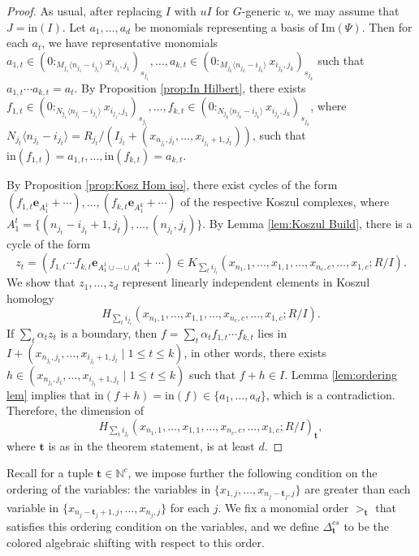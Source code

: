 \documentclass[a4paper, 10pt, reqno, english, ones]{amsart}  %
\theoremstyle{definition}
\theoremstyle{remark}
\begin{document}
\begin{proof}
    As usual, after replacing $I$ with $uI$ for $G$-generic $u$, we may assume that $J=\textrm{in}(I)$. Let $a_1,\dots,a_d$ be monomials representing a basis of $\textrm{Im}(\Psi).$ Then for each $a_t$, we have representative monomials $a_{1,t}\in (0:_{M_{j_1}\langle n_{j_1}-i_{j_1} \rangle}x_{i_{j_1},j_1})_{s_{j_1}},\dots,a_{k,t}\in (0:_{M_{j_k}\langle n_{j_k}-i_{j_k}\rangle }x_{i_{j_k},j_k})_{s_{j_k}}$ such that $a_{1,t}\cdots a_{k,t}=a_t$. By Proposition \ref{prop:In Hilbert}, there exists $f_{1,t}\in (0:_{N_{j_1}\langle n_{j_1}-i_{j_1} \rangle}x_{i_{j_1},j_1})_{s_{j_1}},\dots,f_{k,t}\in (0:_{N_{j_k}\langle n_{j_k}-i_{j_k}\rangle }x_{i_{j_k},j_k})_{s_{j_k}}$, where $N_{j_t}\langle n_{j_t}-i_{j_t} \rangle=R_{j_t}/(I_{j_t} + (x_{n_{j_t},j_t},\dots,x_{i_{j_t}+1,j_t}))$, such that $\textrm{in}(f_{1,t})=a_{1,t},\dots,\textrm{in}(f_{k,t})=a_{k,t}$.

    By Proposition \ref{prop:Kosz Hom iso}, there exist cycles of the form $(f_{1,t}\mathbf{e}_{A_1^{1}}+\cdots),\dots,(f_{k,t}\mathbf{e}_{A_1^{k}}+\cdots)$ of the respective Koszul complexes, where $A^t_1 = \{(n_{j_t}-i_{j_t}+1,j_t),\dots,(n_{j_t},j_t) \}$. By Lemma \ref{lem:Koszul Build}, there is a cycle of the form
    \[
    z_t=(f_{1,t}\cdots f_{k,t}\mathbf{e}_{A_1^1\cup \cdots \cup A_1^k}+\cdots)\in K_{\sum_t i_{j_t}}(x_{n_1,1},\dots,x_{1,1},\dots,x_{n_c,c},\dots,x_{1,c};R/I).
    \]
    We show that $z_1,\dots,z_d$ represent linearly independent elements in Koszul homology $$H_{\sum_t i_{j_t}}(x_{n_1,1},\dots,x_{1,1},\dots,x_{n_c,c},\dots,x_{1,c};R/I).$$ If $\sum_{t}\alpha_t z_t$ is a boundary, then $f=\sum_{t}\alpha_t f_{1,t}\cdots f_{k,t}$ lies in $I+(x_{n_{j_t},j_t},\dots,x_{i_{j_t}+1,j_t}\mid 1\leq t\leq k)$, in other words, there exists $h\in (x_{n_{j_t},j_t},\dots,x_{i_{j_t}+1,j_t}\mid 1\leq t\leq k)$ such that $f+h\in I$. Lemma \ref{lem:ordering lem} implies that $\textrm{in}(f+h) = \textrm{in}(f) \in \{a_1,\dots,a_d\}$, which is a contradiction. Therefore, the dimension of $$H_{\sum_t i_{j_t}}(x_{n_1,1},\dots,x_{1,1},\dots,x_{n_c,c},\dots,x_{1,c};R/I)_{\mathbf{t}},$$ where $\mathbf{t}$ is as in the theorem statement, is at least $d$.
    
\end{proof}

Recall for a tuple $\mathbf{t}\in \mathbb{N}^c$, we impose further the following condition on the ordering of the variables: the variables in $\{x_{1,j},\dots,x_{n_j-\mathbf{t}_j,j} \}$ are greater than each variable in $\{x_{n_j-\mathbf{t}_j+1,j},\dots,x_{n_j,j} \}$ for each $j$. We fix a monomial order $>_\mathbf{t}$ that satisfies this ordering condition on the variables, and we define $\Delta_{\mathbf{t}}^{cs}$ to be the colored algebraic shifting with respect to this order.
\end{document}
